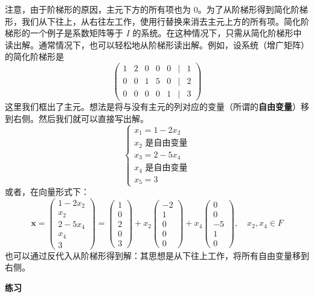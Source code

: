 注意，由于阶梯形的原因，主元下方的所有项也为 0。为了从阶梯形得到简化阶梯形，我们从下往上，从右往左工作，使用行替换来消去主元上方的所有项。简化阶梯形的一个例子是系数矩阵等于 $I$ 的系统。在这种情况下，只需从简化阶梯形中读出解。通常情况下，也可以轻松地从阶梯形读出解。例如，设系统（增广矩阵）的简化阶梯形是
$$
\begin{pmatrix}
1 & 2 & 0 & 0 & 0 & | & 1 \\
0 & 0 & 1 & 5 & 0 & | & 2 \\
0 & 0 & 0 & 0 & 1 & | & 3
\end{pmatrix}
$$
这里我们框出了主元。想法是将与没有主元的列对应的变量（所谓的\textbf{自由变量}）移到右侧。然后我们就可以直接写出解。
$$
\begin{cases}
x_1 = 1 - 2x_2 \\
x_2 \text{ 是自由变量} \\
x_3 = 2 - 5x_4 \\
x_4 \text{ 是自由变量} \\
x_5 = 3
\end{cases}
$$
或者，在向量形式下：
$$
\mathbf{x} = \begin{pmatrix} 1 - 2x_2 \\ x_2 \\ 2 - 5x_4 \\ x_4 \\ 3 \end{pmatrix} = \begin{pmatrix} 1 \\ 0 \\ 2 \\ 0 \\ 3 \end{pmatrix} + x_2 \begin{pmatrix} -2 \\ 1 \\ 0 \\ 0 \\ 0 \end{pmatrix} + x_4 \begin{pmatrix} 0 \\ 0 \\ -5 \\ 1 \\ 0 \end{pmatrix}, \quad x_2, x_4 \in F
$$
也可以通过反代入从阶梯形得到解：其思想是从下往上工作，将所有自由变量移到右侧。


\textbf{练习}~

